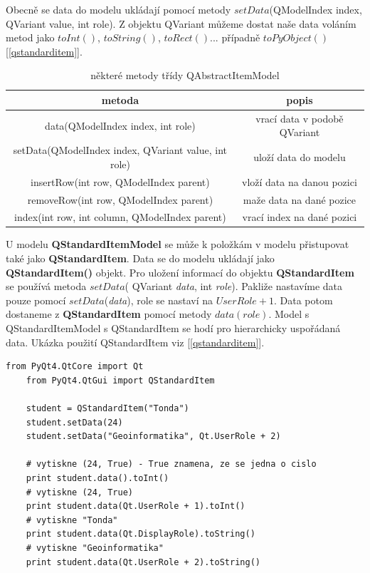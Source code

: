 Obecně se data do modelu ukládají pomocí metody $setData$(QModelIndex
index, QVariant value, int role). Z objektu QVariant můžeme dostat
naše data voláním metod jako $toInt()$, $toString()$,
$toRect()$... případně $toPyObject()$ [\autoref{qstandarditem}].

\begin{table}[h]	
	\centering
{\small
	\begin{tabular}{|c|c|}
		\hline	
		{\bf metoda} & {\bf popis} \\
		\hline
		\hline
		data(QModelIndex index, int role) & vrací data v podobě QVariant \\
		\hline
		setData(QModelIndex index, QVariant value, int role) & uloží data do modelu \\
		\hline
		insertRow(int row, QModelIndex parent) & vloží data na danou pozici \\
		\hline
		removeRow(int row, QModelIndex parent) & maže data na dané pozice \\
		\hline
		index(int row, int column, QModelIndex parent) & vrací index na dané pozici \\
		\hline


	\end{tabular}
}
	\caption{některé metody třídy QAbstractItemModel}
	\label{tab:qabsmodel}
\end{table}

U modelu \textbf{QStandardItemModel} se může k položkám v modelu
přistupovat také jako \textbf{QStandardItem}. Data se do modelu
ukládají jako \textbf{QStandardItem()} objekt. Pro uložení informací
do objektu \textbf{QStandardItem} se používá metoda $setData$(\newline
QVariant \textit{data}, int \textit{role}). Pakliže nastavíme data
pouze pomocí $setData$(\textit{data}), role se nastaví na $UserRole +
1$. Data potom dostaneme z \textbf{QStandardItem} pomocí metody
$data(role)$. Model s QStandardItemModel s QStandardItem se hodí pro
hierarchicky uspořádaná data. Ukázka použití QStandardItem viz
[\autoref{qstandarditem}]. \\

\newpage
\begin{lstlisting}[label=qstandarditem,caption={QStandardItem - vytvoření a získání dat}, morekeywords={PyQt4, QtCore, QtGui, QStandardItem, Qt, Qt.UserRole, Qt.DisplayRole}]
	from PyQt4.QtCore import Qt
	from PyQt4.QtGui import QStandardItem

	student = QStandardItem("Tonda")
	student.setData(24)
	student.setData("Geoinformatika", Qt.UserRole + 2)

	# vytiskne (24, True) - True znamena, ze se jedna o cislo
	print student.data().toInt() 					
	# vytiskne (24, True)
	print student.data(Qt.UserRole + 1).toInt()		
	# vytiskne "Tonda"
	print student.data(Qt.DisplayRole).toString() 	
	# vytiskne "Geoinformatika"
	print student.data(Qt.UserRole + 2).toString() 	

\end{lstlisting}

